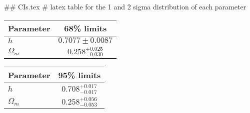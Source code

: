 ## CIs.tex
# latex table for the 1 and 2 sigma distribution of each parameter

\begin{tabular} { l  c}
 Parameter &  68\% limits\\
\hline
{\boldmath$h              $} & $0.7077\pm 0.0087          $\\
{\boldmath$\Omega_m       $} & $0.258^{+0.025}_{-0.030}   $\\
\hline
\end{tabular}

\begin{tabular} { l  c}
 Parameter &  95\% limits\\
\hline
{\boldmath$h              $} & $0.708^{+0.017}_{-0.017}   $\\
{\boldmath$\Omega_m       $} & $0.258^{+0.056}_{-0.053}   $\\
\hline
\end{tabular}
